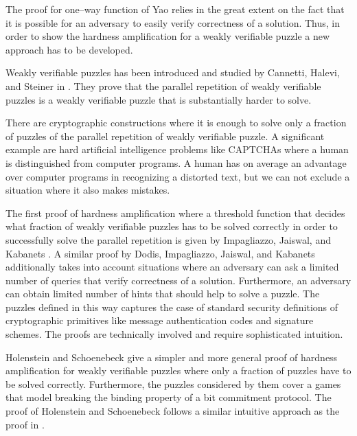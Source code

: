 \documentclass[11pt,a4paper,titlepage]{memoir}
\begin{document}
The proof for one--way function of Yao relies in the great extent on the fact that it is possible
for an adversary to easily verify correctness of a solution. Thus, in order to show the hardness
amplification for a weakly verifiable puzzle a new approach has to be developed.

Weakly verifiable puzzles has been introduced and studied by Cannetti, Halevi, and Steiner in \cite{canetti2004hardness}.
They prove that the parallel repetition of weakly verifiable puzzles is a weakly verifiable puzzle that is substantially harder to solve.

There are cryptographic constructions where it is enough to solve only a fraction of puzzles of the parallel repetition of weakly verifiable puzzle.
A significant example are hard artificial intelligence problems like CAPTCHAs where a human is distinguished from computer programs.
A human has on average an advantage over computer programs in recognizing a distorted text, but we can not exclude a situation where it also makes mistakes.

The first proof of hardness amplification where a threshold function that decides what fraction of weakly verifiable puzzles has to be solved correctly
in order to successfully solve the parallel repetition is given by Impagliazzo, Jaiswal, and Kabanets \cite{impagliazzo2007chernoff}.
A similar proof by Dodis, Impagliazzo, Jaiswal, and Kabanets \cite{Dodis:2009:SAI:1530441.1530450} additionally
takes into account situations where an adversary can ask a limited number of queries that verify correctness of a solution.
Furthermore, an adversary can obtain limited number of hints that should help to solve a puzzle.
The puzzles defined in this way captures the case of standard security definitions of cryptographic primitives
like message authentication codes and signature schemes. The proofs \cite{impagliazzo2007chernoff, Dodis:2009:SAI:1530441.1530450} are technically
involved and require sophisticated intuition.

Holenstein and Schoenebeck \cite{DBLP:journals/corr/abs-1002-3534} give a simpler and more general
proof of hardness amplification for weakly verifiable puzzles where only a fraction of puzzles have to be solved correctly.
Furthermore, the puzzles considered by them cover a games that model breaking the binding property of a bit commitment protocol.
The proof of Holenstein and Schoenebeck follows a similar intuitive approach as the proof in \cite{canetti2004hardness}.
\end{document}
